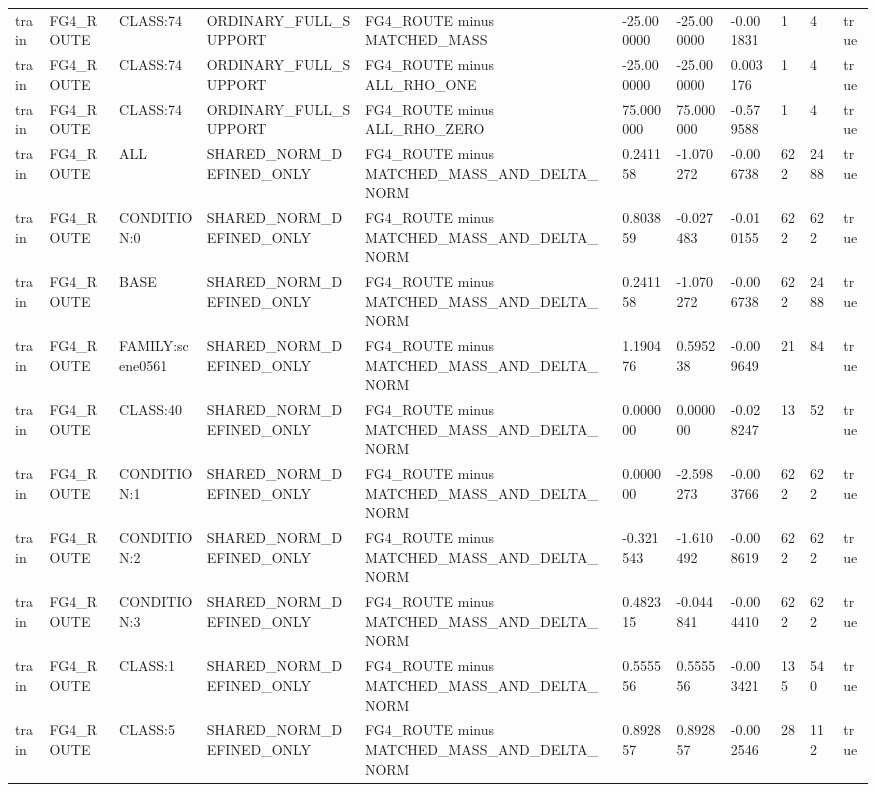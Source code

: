 \begin{tabular}{lllllllllll}
train & FG4\_ROUTE & CLASS:74 & ORDINARY\_FULL\_SUPPORT & FG4\_ROUTE minus MATCHED\_MASS & -25.000000 & -25.000000 & -0.001831 & 1 & 4 & true \\
train & FG4\_ROUTE & CLASS:74 & ORDINARY\_FULL\_SUPPORT & FG4\_ROUTE minus ALL\_RHO\_ONE & -25.000000 & -25.000000 & 0.003176 & 1 & 4 & true \\
train & FG4\_ROUTE & CLASS:74 & ORDINARY\_FULL\_SUPPORT & FG4\_ROUTE minus ALL\_RHO\_ZERO & 75.000000 & 75.000000 & -0.579588 & 1 & 4 & true \\
train & FG4\_ROUTE & ALL & SHARED\_NORM\_DEFINED\_ONLY & FG4\_ROUTE minus MATCHED\_MASS\_AND\_DELTA\_NORM & 0.241158 & -1.070272 & -0.006738 & 622 & 2488 & true \\
train & FG4\_ROUTE & CONDITION:0 & SHARED\_NORM\_DEFINED\_ONLY & FG4\_ROUTE minus MATCHED\_MASS\_AND\_DELTA\_NORM & 0.803859 & -0.027483 & -0.010155 & 622 & 622 & true \\
train & FG4\_ROUTE & BASE & SHARED\_NORM\_DEFINED\_ONLY & FG4\_ROUTE minus MATCHED\_MASS\_AND\_DELTA\_NORM & 0.241158 & -1.070272 & -0.006738 & 622 & 2488 & true \\
train & FG4\_ROUTE & FAMILY:scene0561 & SHARED\_NORM\_DEFINED\_ONLY & FG4\_ROUTE minus MATCHED\_MASS\_AND\_DELTA\_NORM & 1.190476 & 0.595238 & -0.009649 & 21 & 84 & true \\
train & FG4\_ROUTE & CLASS:40 & SHARED\_NORM\_DEFINED\_ONLY & FG4\_ROUTE minus MATCHED\_MASS\_AND\_DELTA\_NORM & 0.000000 & 0.000000 & -0.028247 & 13 & 52 & true \\
train & FG4\_ROUTE & CONDITION:1 & SHARED\_NORM\_DEFINED\_ONLY & FG4\_ROUTE minus MATCHED\_MASS\_AND\_DELTA\_NORM & 0.000000 & -2.598273 & -0.003766 & 622 & 622 & true \\
train & FG4\_ROUTE & CONDITION:2 & SHARED\_NORM\_DEFINED\_ONLY & FG4\_ROUTE minus MATCHED\_MASS\_AND\_DELTA\_NORM & -0.321543 & -1.610492 & -0.008619 & 622 & 622 & true \\
train & FG4\_ROUTE & CONDITION:3 & SHARED\_NORM\_DEFINED\_ONLY & FG4\_ROUTE minus MATCHED\_MASS\_AND\_DELTA\_NORM & 0.482315 & -0.044841 & -0.004410 & 622 & 622 & true \\
train & FG4\_ROUTE & CLASS:1 & SHARED\_NORM\_DEFINED\_ONLY & FG4\_ROUTE minus MATCHED\_MASS\_AND\_DELTA\_NORM & 0.555556 & 0.555556 & -0.003421 & 135 & 540 & true \\
train & FG4\_ROUTE & CLASS:5 & SHARED\_NORM\_DEFINED\_ONLY & FG4\_ROUTE minus MATCHED\_MASS\_AND\_DELTA\_NORM & 0.892857 & 0.892857 & -0.002546 & 28 & 112 & true \\

\end{tabular}
